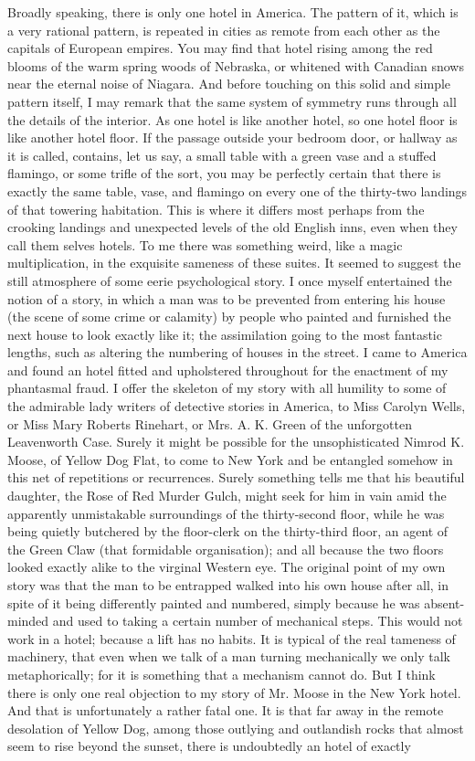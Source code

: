 \documentclass{book}
\begin{document}
Broadly speaking, there is only one hotel in America. The pattern of it, which is a very rational pattern, is repeated in cities as remote from each other as the capitals of European empires. You may find that hotel rising among the red blooms of the warm spring woods of Nebraska, or whitened with Canadian snows near the eternal noise of Niagara. And before touching on this solid and simple pattern itself, I may remark that the same system of symmetry runs through all the details of the interior. As one hotel is like another hotel, so one hotel floor is like another hotel floor. If the passage outside your bedroom door, or hallway as it is called, contains, let us say, a small table with a green vase and a stuffed flamingo, or some trifle of the sort, you may be perfectly certain that there is exactly the same table, vase, and flamingo on every one of the thirty-two landings of that towering habitation. This is where it differs most perhaps from the crooking landings and unexpected levels of the old English inns, even when they call them selves hotels. To me there was something weird, like a magic multiplication, in the exquisite sameness of these suites. It seemed to suggest the still atmosphere of some eerie psychological story. I once myself entertained the notion of a story, in which a man was to be prevented from entering his house (the scene of some crime or calamity) by people who painted and furnished the next house to look exactly like it; the assimilation going to the most fantastic lengths, such as altering the numbering of houses in the street. I came to America and found an hotel fitted and upholstered throughout for the enactment of my phantasmal fraud. I offer the skeleton of my story with all humility to some of the admirable lady writers of detective stories in America, to Miss Carolyn Wells, or Miss Mary Roberts Rinehart, or Mrs. A. K. Green of the unforgotten Leavenworth Case. Surely it might be possible for the unsophisticated Nimrod K. Moose, of Yellow Dog Flat, to come to New York and be entangled somehow in this net of repetitions or recurrences. Surely something tells me that his beautiful daughter, the Rose of Red Murder Gulch, might seek for him in vain amid the apparently unmistakable surroundings of the thirty-second floor, while he was being quietly butchered by the floor-clerk on the thirty-third floor, an agent of the Green Claw (that formidable organisation); and all because the two floors looked exactly alike to the virginal Western eye. The original point of my own story was that the man to be entrapped walked into his own house after all, in spite of it being differently painted and numbered, simply because he was absent-minded and used to taking a certain number of mechanical steps. This would not work in a hotel; because a lift has no habits. It is typical of the real tameness of machinery, that even when we talk of a man turning mechanically we only talk metaphorically; for it is something that a mechanism cannot do. But I think there is only one real objection to my story of Mr. Moose in the New York hotel. And that is unfortunately a rather fatal one. It is that far away in the remote desolation of Yellow Dog, among those outlying and outlandish rocks that almost seem to rise beyond the sunset, there is undoubtedly an hotel of exactly 
\end{document}
